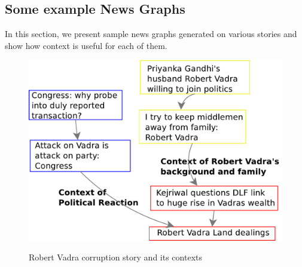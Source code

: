 \subsection{Some example News Graphs}
In this section, we present sample news graphs generated on various stories and show how context is useful for each of them.

\begin{figure}
\caption{Robert Vadra corruption story and its contexts}
\includegraphics[scale=0.30]{figures/graph-vadra.pdf}
\label{fig:vadra-corruption}
\end{figure}

